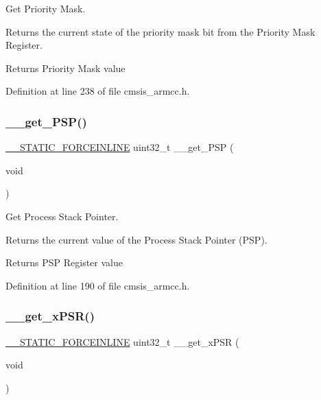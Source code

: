 Get Priority Mask. 

Returns the current state of the priority mask bit from the Priority Mask Register. \begin{DoxyReturn}{Returns}
Priority Mask value 
\end{DoxyReturn}


Definition at line 238 of file cmsis\+\_\+armcc.\+h.

\mbox{\label{group___c_m_s_i_s___core___reg_acc_functions_ga826c53e30812e350c77f58aac9f42bcb}} 
\subsubsection{\texorpdfstring{\+\_\+\+\_\+get\+\_\+\+P\+S\+P()}{\_\_get\_PSP()}}
{\footnotesize\ttfamily \hyperlink{cmsis__iccarm_8h_ab904513442afdf77d4f8c74f23cbb040}{\+\_\+\+\_\+\+S\+T\+A\+T\+I\+C\+\_\+\+F\+O\+R\+C\+E\+I\+N\+L\+I\+NE} uint32\+\_\+t \+\_\+\+\_\+get\+\_\+\+P\+SP (\begin{DoxyParamCaption}\item[{void}]{ }\end{DoxyParamCaption})}



Get Process Stack Pointer. 

Returns the current value of the Process Stack Pointer (P\+SP). \begin{DoxyReturn}{Returns}
P\+SP Register value 
\end{DoxyReturn}


Definition at line 190 of file cmsis\+\_\+armcc.\+h.

\mbox{\label{group___c_m_s_i_s___core___reg_acc_functions_ga52ca795dc9429ee0ac64ddd12c034834}} 
\subsubsection{\texorpdfstring{\+\_\+\+\_\+get\+\_\+x\+P\+S\+R()}{\_\_get\_xPSR()}}
{\footnotesize\ttfamily \hyperlink{cmsis__iccarm_8h_ab904513442afdf77d4f8c74f23cbb040}{\+\_\+\+\_\+\+S\+T\+A\+T\+I\+C\+\_\+\+F\+O\+R\+C\+E\+I\+N\+L\+I\+NE} uint32\+\_\+t \+\_\+\+\_\+get\+\_\+x\+P\+SR (\begin{DoxyParamCaption}\item[{void}]{ }\end{DoxyParamCaption})}



